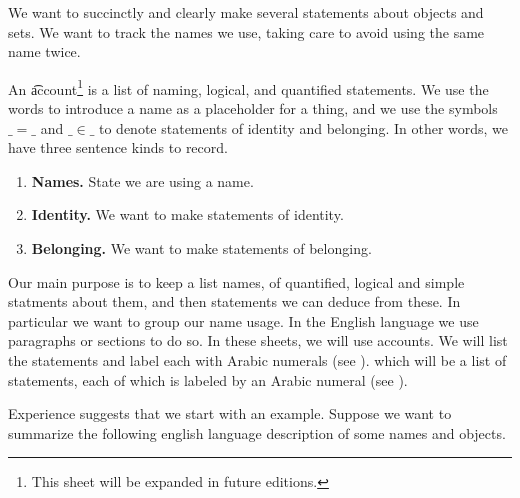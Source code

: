 

We want to succinctly and clearly make several statements about objects and sets. We want to track the names we use, taking care to avoid using the same name twice.


An \t{account}\footnote{This sheet will be expanded in future editions.} is a list of naming, logical, and quantified statements.
We use the words  to introduce a name as a placeholder for a thing, and we use the symbols $\_=\_$ and $\_\in\_$ to denote statements of identity and belonging.
In other words, we have three sentence kinds to record.

\begin{enumerate}

  \item
  \textbf{Names.}
  State we are using a name.

  \item
  \textbf{Identity.}
  We want to make statements of identity.

  \item
  \textbf{Belonging.}
  We want to make statements of belonging.

\end{enumerate}

Our main purpose is to keep a list names, of quantified, logical and simple statments about them, and then statements we can deduce from these.
In particular we want to group our name usage.
In the English language we use paragraphs or sections to do so.
In these sheets, we will use accounts.
We will list the statements and label each with Arabic numerals (see ).
which will be a list of statements, each of which is labeled by an Arabic numeral (see ).

Experience suggests that we start with an example.
Suppose we want to summarize the following english language description of some names and objects.

